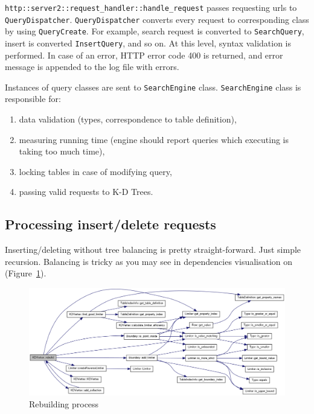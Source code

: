 \documentclass[10pt,a4paper]{article}
\begin{document}
\verb|http::server2::request_handler::handle_request| passes requesting urls to \verb|QueryDispatcher|. \verb|QueryDispatcher| converts every request to corresponding class by using \verb|QueryCreate|. For example, search request is converted to \verb|SearchQuery|, insert is converted \verb|InsertQuery|, and so on. At this level, syntax validation is performed. In case of an error, HTTP error code 400 is returned, and error message is appended to the log file with errors. 

Instances of query classes are sent to \verb|SearchEngine| class. \verb|SearchEngine| class is responsible for:
\begin{enumerate}
\item data validation (types, correspondence to table definition),
\item measuring running time (engine should report queries which executing is taking too much time),
\item locking tables in case of modifying query,
\item passing valid requests to K-D Trees.
\end{enumerate}

\subsection{Processing insert/delete requests}

Inserting/deleting without tree balancing is pretty straight-forward. Just simple recursion. Balancing is tricky as you may see in dependencies visualisation on (Figure~\ref{fig:rebuild}).

\begin{figure}
\centering
  \includegraphics[width=16cm]{rebuild}
  \caption{Rebuilding process}
  \label{fig:rebuild}
\end{figure}
\end{document}
